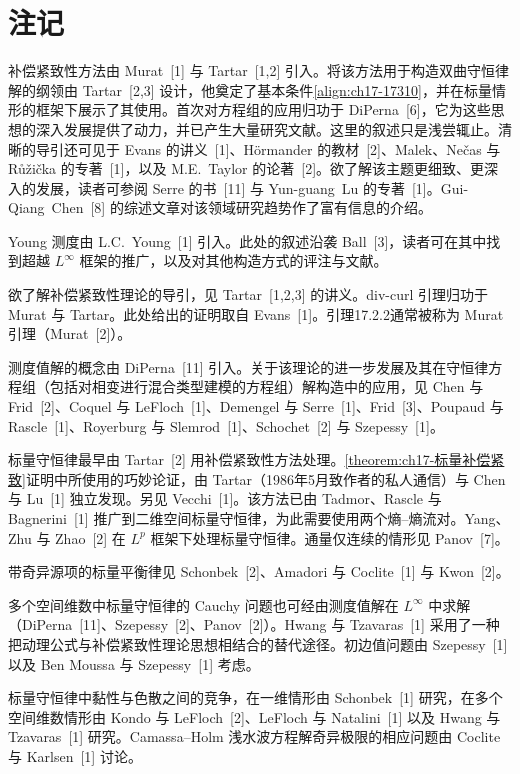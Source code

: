 \documentclass[../../main.tex]{subfiles}
\begin{document}
\section{注记}\label{section:ch17-notes}

补偿紧致性方法由 Murat~[1] 与 Tartar~[1,2] 引入。将该方法用于构造双曲守恒律解的纲领由 Tartar~[2,3] 设计，他奠定了基本条件\eqref{align:ch17-17310}，并在标量情形的框架下展示了其使用。首次对方程组的应用归功于 DiPerna~[6]，它为这些思想的深入发展提供了动力，并已产生大量研究文献。这里的叙述只是浅尝辄止。清晰的导引还可见于 Evans 的讲义~[1]、Hörmander 的教材~[2]、Malek、Nečas 与 Růžička 的专著~[1]，以及 M.E.~Taylor 的论著~[2]。欲了解该主题更细致、更深入的发展，读者可参阅 Serre 的书~[11] 与 Yun-guang~Lu 的专著~[1]。Gui-Qiang~Chen~[8] 的综述文章对该领域研究趋势作了富有信息的介绍。

Young 测度由 L.C.~Young~[1] 引入。此处的叙述沿袭 Ball~[3]，读者可在其中找到超越 $L^\infty$ 框架的推广，以及对其他构造方式的评注与文献。

欲了解补偿紧致性理论的导引，见 Tartar~[1,2,3] 的讲义。div-curl 引理归功于 Murat 与 Tartar。此处给出的证明取自 Evans~[1]。引理17.2.2通常被称为 Murat 引理（Murat~[2]）。

测度值解的概念由 DiPerna~[11] 引入。关于该理论的进一步发展及其在守恒律方程组（包括对相变进行混合类型建模的方程组）解构造中的应用，见 Chen 与 Frid~[2]、Coquel 与 LeFloch~[1]、Demengel 与 Serre~[1]、Frid~[3]、Poupaud 与 Rascle~[1]、Royerburg 与 Slemrod~[1]、Schochet~[2] 与 Szepessy~[1]。

标量守恒律最早由 Tartar~[2] 用补偿紧致性方法处理。\cref{theorem:ch17-标量补偿紧致}证明中所使用的巧妙论证，由 Tartar（1986年5月致作者的私人通信）与 Chen 与 Lu~[1] 独立发现。另见 Vecchi~[1]。该方法已由 Tadmor、Rascle 与 Bagnerini~[1] 推广到二维空间标量守恒律，为此需要使用两个熵--熵流对。Yang、Zhu 与 Zhao~[2] 在 $L^p$ 框架下处理标量守恒律。通量仅连续的情形见 Panov~[7]。

带奇异源项的标量平衡律见 Schonbek~[2]、Amadori 与 Coclite~[1] 与 Kwon~[2]。

多个空间维数中标量守恒律的 Cauchy 问题也可经由测度值解在 $L^\infty$ 中求解（DiPerna~[11]、Szepessy~[2]、Panov~[2]）。Hwang 与 Tzavaras~[1] 采用了一种把动理公式与补偿紧致性理论思想相结合的替代途径。初边值问题由 Szepessy~[1] 以及 Ben Moussa 与 Szepessy~[1] 考虑。

标量守恒律中黏性与色散之间的竞争，在一维情形由 Schonbek~[1] 研究，在多个空间维数情形由 Kondo 与 LeFloch~[2]、LeFloch 与 Natalini~[1] 以及 Hwang 与 Tzavaras~[1] 研究。Camassa--Holm 浅水波方程解奇异极限的相应问题由 Coclite 与 Karlsen~[1] 讨论。
\end{document}
